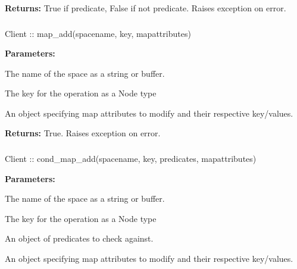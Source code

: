 \noindent\textbf{Returns:}
True if predicate, False if not predicate.  Raises exception on error.

\subsubsection{}
\label{api:nodejs:map_add}
\begin{javascriptcode}
Client :: map_add(spacename, key, mapattributes)
\end{javascriptcode}
\funcdesc 

\noindent\textbf{Parameters:}
\begin{description}[labelindent=\widthof{{\code{mapattributes}}},leftmargin=*,noitemsep,nolistsep,align=right]
\item[\code{spacename}] The name of the space as a string or buffer.
\item[\code{key}] The key for the operation as a Node type
\item[\code{mapattributes}] An object specifying map attributes to modify and their respective key/values.
\end{description}

\noindent\textbf{Returns:}
True.  Raises exception on error.

\subsubsection{}
\label{api:nodejs:cond_map_add}
\begin{javascriptcode}
Client :: cond_map_add(spacename, key, predicates, mapattributes)
\end{javascriptcode}
\funcdesc 

\noindent\textbf{Parameters:}
\begin{description}[labelindent=\widthof{{\code{mapattributes}}},leftmargin=*,noitemsep,nolistsep,align=right]
\item[\code{spacename}] The name of the space as a string or buffer.
\item[\code{key}] The key for the operation as a Node type
\item[\code{predicates}] An object of predicates to check against.
\item[\code{mapattributes}] An object specifying map attributes to modify and their respective key/values.
\end{description}


